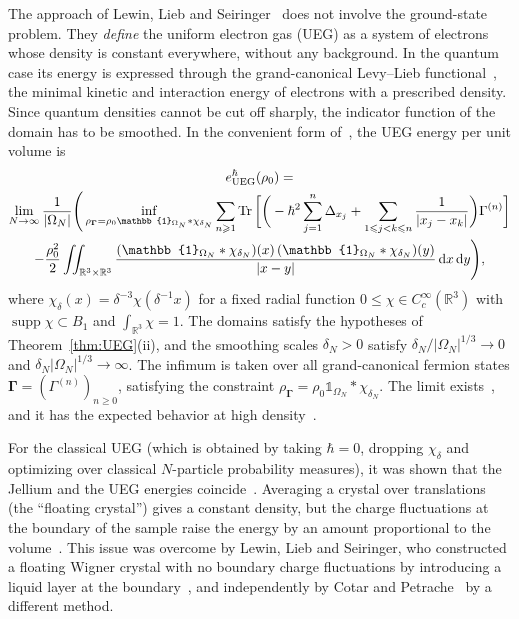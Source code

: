\documentclass[final,reqno]{amsart}
\DeclareMathOperator{\supp}{supp}
\theoremstyle{remark}
\theoremstyle{definition}
\renewcommand{\le}{\leqslant}
\renewcommand{\ge}{\geqslant}
\newcommand{\RR}{\mathbb{R}}
\newcommand{\iden}{\mathbb{1}}
\newcommand{\UEG}{\mathrm{UEG}}
\newcommand{\vGamma}{{\bm{\Gamma}}}
\begin{document}
The approach of Lewin, Lieb and Seiringer~\cite{lewin2018statistical} does not involve the ground-state problem. They \emph{define} the uniform electron gas (UEG) as a system of electrons whose density is constant everywhere, without any background. In the quantum case its energy is expressed through the grand-canonical Levy--Lieb functional~\cite{lewin2019universal}, the minimal kinetic and interaction energy of electrons with a prescribed density. Since quantum densities cannot be cut off sharply, the indicator function of the domain has to be smoothed. In the convenient form of~\cite{lewin2020local}, the UEG energy per unit volume is
\begin{multline*}
e^\hbar_\UEG(\rho_0)=\\
\lim_{N\to\infty}\frac1{|\Omega_N|}\Bigg(\inf_{\rho_{\vGamma}=\rho_0\iden_{\Omega_N}*\chi_{\delta_N}}\sum_{n\ge1}\Tr\bigg[\bigg(-\hbar^2\sum_{j=1}^n\Delta_{x_j}+\sum_{1\le j<k\le n}\frac1{|x_j-x_k|}\bigg)\Gamma^{(n)}\bigg]\\
-\frac{\rho_0^2}2\iint_{\RR^3\times\RR^3}\frac{(\iden_{\Omega_N}*\chi_{\delta_N})(x)\,(\iden_{\Omega_N}*\chi_{\delta_N})(y)}{|x-y|}\,\mathrm dx\,\mathrm dy\Bigg),
\end{multline*}
where $\chi_\delta(x)=\delta^{-3}\chi(\delta^{-1}x)$ for a fixed radial function $0\le\chi\in C_c^\infty(\RR^3)$ with $\supp\chi\subset B_1$ and $\int_{\RR^3}\chi=1$. The domains satisfy the hypotheses of Theorem~\ref{thm:UEG}(ii), and the smoothing scales $\delta_N>0$ satisfy $\delta_N/|\Omega_N|^{1/3}\to0$ and $\delta_N|\Omega_N|^{1/3}\to\infty$. The infimum is taken over all grand-canonical fermion states $\vGamma=(\Gamma^{(n)})_{n\ge0}$, satisfying the constraint $\rho_{\vGamma}=\rho_0\iden_{\Omega_N}*\chi_{\delta_N}$. The limit exists~\cite{lewin2018statistical,lewin2020local}, and it has the expected behavior at high density~\cite{lewin2018statistical}.

For the classical UEG (which is obtained by taking $\hbar=0$, dropping $\chi_\delta$ and optimizing over classical $N$-particle probability measures), it was shown that the Jellium and the UEG energies coincide~\cite{lewin2019floating,cotar2017equality}. Averaging a crystal over translations (the ``floating crystal'') gives a constant density, but the charge fluctuations at the boundary of the sample raise the energy by an amount proportional to the volume~\cite[Appendix~B]{lewin2015improved}. This issue was overcome by Lewin, Lieb and Seiringer, who constructed a floating Wigner crystal with no boundary charge fluctuations by introducing a liquid layer at the boundary~\cite{lewin2019floating}, and independently by Cotar and Petrache~\cite{cotar2017equality} by a different method.
\end{document}
